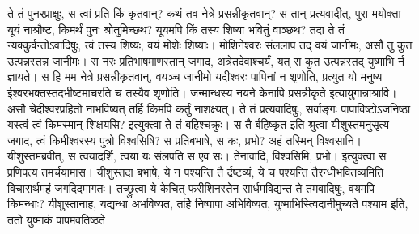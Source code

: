 \vakya ते तं पुनरप्राक्षुः, स त्वां प्रति किं कृतवान्? कथं तव नेत्रे प्रसन्नीकृतवान्?
\vakya स तान् प्रत्यवादीत्, पुरा मयोक्ता यूयं नाश्रौष्ट, किमर्थं पुनः श्रोतुमिच्छथ? यूयमपि किं तस्य शिष्या भवितुं वाञ्छथ?
\vakya तदा ते तं न्यक्कुर्वन्तोऽवादिषुः, त्वं तस्य शिष्यः, वयं मोशेः शिष्याः।
\vakya मोशिनेश्वरः संललाप तद् वयं जानीमः, असौ तु कुत उत्पन्नस्तन्न जानीमः।
\vakya स नरः प्रतिभाषमाणस्तान् जगाद, अत्रेतदेवाश्चर्यं, यत् स कुत उत्पन्नस्तद् युष्माभि र्न ज्ञायते।
\vakya स हि मम नेत्रे प्रसन्नीकृतवान्, वयञ्च जानीमो यदीश्वरः पापिनां न शृणोति, प्रत्युत यो मनुष्य ईश्वरभक्तस्तदभीष्टमाचरति च तस्यैव शृणोति।
\vakya जन्मान्धस्य नयने केनापि प्रसन्नीकृते इत्यायुगान्नाश्रावि।
\vakya असौ चेदीश्वरप्रहितो नाभविष्यत् तर्हि किमपि कर्तुं नाशक्ष्यत्।
\vakya ते तं प्रत्यवादिषुः, सर्वाङ्गः पापाविष्टोऽजनिष्ठा यस्त्वं त्वं किमस्मान् शिक्षयसि? इत्युक्त्वा ते तं बहिश्चक्रुः।
\vakya स तै र्बहिष्कृत इति श्रुत्वा यीशुस्तमनुसृत्य जगाद, त्वं किमीश्वरस्य पुत्रो विश्वसिषि?
\vakya स प्रतिबभाषे, स कः, प्रभो? अहं तस्मिन् विश्वसानि।
\vakya यीशुस्तमब्रवीत्, स त्वयादर्शि, त्वया यः संलपति स एव सः।
\vakya तेनावादि, विश्वसिमि, प्रभो। इत्युक्त्वा स प्रणिपत्य तमर्चयामास।
\vakya यीशुस्तदा बभाषे, ये न पश्यन्ति तै र्द्रष्टव्यं, ये च पश्यन्ति तैरन्धीभवितव्यमिति विचारार्थमहं जगदिदमागतः।
\vakya तच्छ्रुत्वा ये केचित् फरीशिनस्तेन सार्धमविद्यन्त ते तमवादिषुः, वयमपि किमन्धाः?
\vakya यीशुस्तानाह, यद्यन्धा अभविष्यत, तर्हि निष्पापा अभिविष्यत, युष्माभिस्त्विदानीमुच्यते पश्याम इति, ततो युष्माकं पापमवतिष्ठते\eoc